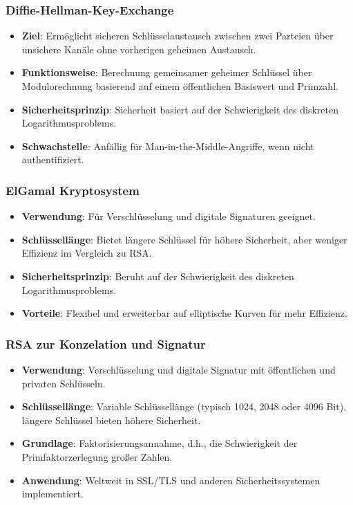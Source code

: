 \documentclass{article}
\begin{document}
\subsubsection{Diffie-Hellman-Key-Exchange}
\begin{itemize}
  \item \textbf{Ziel}: Ermöglicht sicheren Schlüsselaustausch zwischen zwei Parteien über unsichere Kanäle ohne vorherigen geheimen Austausch.
  \item \textbf{Funktionsweise}: Berechnung gemeinsamer geheimer Schlüssel über Modulorechnung basierend auf einem öffentlichen Basiswert und Primzahl.
  \item \textbf{Sicherheitsprinzip}: Sicherheit basiert auf der Schwierigkeit des diskreten Logarithmusproblems.
  \item \textbf{Schwachstelle}: Anfällig für Man-in-the-Middle-Angriffe, wenn nicht authentifiziert.
\end{itemize}

\subsubsection{ElGamal Kryptosystem}
\begin{itemize}
  \item \textbf{Verwendung}: Für Verschlüsselung und digitale Signaturen geeignet.
  \item \textbf{Schlüssellänge}: Bietet längere Schlüssel für höhere Sicherheit, aber weniger Effizienz im Vergleich zu RSA.
  \item \textbf{Sicherheitsprinzip}: Beruht auf der Schwierigkeit des diskreten Logarithmusproblems.
  \item \textbf{Vorteile}: Flexibel und erweiterbar auf elliptische Kurven für mehr Effizienz.
\end{itemize}

\subsubsection{RSA zur Konzelation und Signatur}
\begin{itemize}
  \item \textbf{Verwendung}: Verschlüsselung und digitale Signatur mit öffentlichen und privaten Schlüsseln.
  \item \textbf{Schlüssellänge}: Variable Schlüssellänge (typisch 1024, 2048 oder 4096 Bit), längere Schlüssel bieten höhere Sicherheit.
  \item \textbf{Grundlage}: Faktorisierungsannahme, d.h., die Schwierigkeit der Primfaktorzerlegung großer Zahlen.
  \item \textbf{Anwendung}: Weltweit in SSL/TLS und anderen Sicherheitssystemen implementiert.
\end{itemize}
\end{document}

